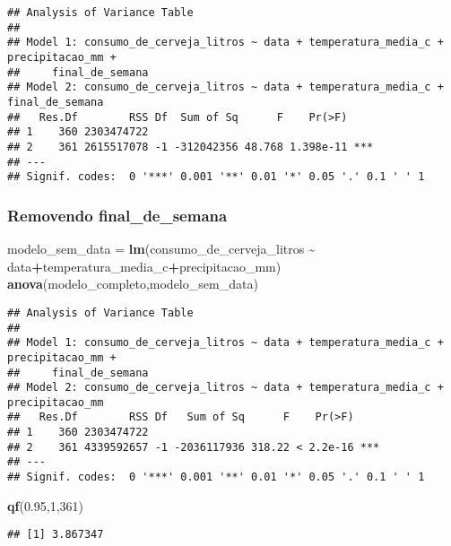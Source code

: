 \documentclass[
]{article}
\newenvironment{Shaded}{\begin{snugshade}}{\end{snugshade}}
\newcommand{\DecValTok}[1]{\textcolor[rgb]{0.00,0.00,0.81}{#1}}
\newcommand{\FloatTok}[1]{\textcolor[rgb]{0.00,0.00,0.81}{#1}}
\newcommand{\FunctionTok}[1]{\textcolor[rgb]{0.13,0.29,0.53}{\textbf{#1}}}
\newcommand{\NormalTok}[1]{#1}
\newcommand{\OtherTok}[1]{\textcolor[rgb]{0.56,0.35,0.01}{#1}}
\newcommand{\SpecialCharTok}[1]{\textcolor[rgb]{0.81,0.36,0.00}{\textbf{#1}}}
\begin{document}
\begin{verbatim}
## Analysis of Variance Table
## 
## Model 1: consumo_de_cerveja_litros ~ data + temperatura_media_c + precipitacao_mm + 
##     final_de_semana
## Model 2: consumo_de_cerveja_litros ~ data + temperatura_media_c + final_de_semana
##   Res.Df        RSS Df  Sum of Sq      F    Pr(>F)    
## 1    360 2303474722                                   
## 2    361 2615517078 -1 -312042356 48.768 1.398e-11 ***
## ---
## Signif. codes:  0 '***' 0.001 '**' 0.01 '*' 0.05 '.' 0.1 ' ' 1
\end{verbatim}

\hypertarget{removendo-final_de_semana}{%
\subsubsection{Removendo
final\_de\_semana}\label{removendo-final_de_semana}}

\begin{Shaded}
\begin{Highlighting}[]
\NormalTok{modelo\_sem\_data }\OtherTok{=} \FunctionTok{lm}\NormalTok{(consumo\_de\_cerveja\_litros }\SpecialCharTok{\textasciitilde{}}\NormalTok{ data}\SpecialCharTok{+}\NormalTok{temperatura\_media\_c}\SpecialCharTok{+}\NormalTok{precipitacao\_mm)}
\FunctionTok{anova}\NormalTok{(modelo\_completo,modelo\_sem\_data)}
\end{Highlighting}
\end{Shaded}

\begin{verbatim}
## Analysis of Variance Table
## 
## Model 1: consumo_de_cerveja_litros ~ data + temperatura_media_c + precipitacao_mm + 
##     final_de_semana
## Model 2: consumo_de_cerveja_litros ~ data + temperatura_media_c + precipitacao_mm
##   Res.Df        RSS Df   Sum of Sq      F    Pr(>F)    
## 1    360 2303474722                                    
## 2    361 4339592657 -1 -2036117936 318.22 < 2.2e-16 ***
## ---
## Signif. codes:  0 '***' 0.001 '**' 0.01 '*' 0.05 '.' 0.1 ' ' 1
\end{verbatim}

\begin{Shaded}
\begin{Highlighting}[]
\FunctionTok{qf}\NormalTok{(}\FloatTok{0.95}\NormalTok{,}\DecValTok{1}\NormalTok{,}\DecValTok{361}\NormalTok{)}
\end{Highlighting}
\end{Shaded}

\begin{verbatim}
## [1] 3.867347
\end{verbatim}
\end{document}
